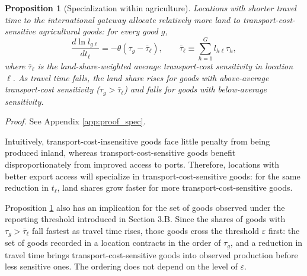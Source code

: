 \documentclass[11pt]{article}
\newtheorem{proposition}{Proposition}
\begin{document}
\begin{proposition}[Specialization within agriculture]
\label{prop:specialization}
Locations with shorter travel time to the international gateway allocate relatively more land to transport-cost-sensitive agricultural goods: for every good $g$,
\begin{equation}
    \frac{d \ln l_{g\ell}}{d t_\ell}
= -\theta \left(\tau_g - \bar{\tau}_\ell\right),
\qquad
\bar{\tau}_\ell \equiv \sum_{h=1}^G l_{h\ell} \tau_h,
\label{eq:landshare_d}
\end{equation}
where $\bar{\tau}_\ell$ is the land-share-weighted average transport-cost sensitivity in location $\ell$. As travel time falls, the land share rises for goods with above-average transport-cost sensitivity ($\tau_g > \bar{\tau}_\ell$) and falls for goods with below-average sensitivity.
\end{proposition}

\noindent\emph{Proof.} See Appendix \ref{app:proof_spec}.\medskip

Intuitively, transport-cost-insensitive goods face little penalty from being produced inland, whereas transport-cost-sensitive goods benefit disproportionately from improved access to ports. Therefore, locations with better export access will specialize in transport-cost-sensitive goods: for the same reduction in $t_\ell$, land shares grow faster for more transport-cost-sensitive goods.

Proposition \ref{prop:specialization} also has an implication for the set of goods observed under the reporting threshold introduced in Section 3.B. Since the shares of goods with $\tau_g>\bar\tau_\ell$ fall fastest as travel time rises, those goods cross the threshold $\varepsilon$ first: the set of goods recorded in a location contracts in the order of $\tau_g$, and a reduction in travel time brings transport-cost-sensitive goods into observed production before less sensitive ones. The ordering does not depend on the level of $\varepsilon$.
\end{document}
